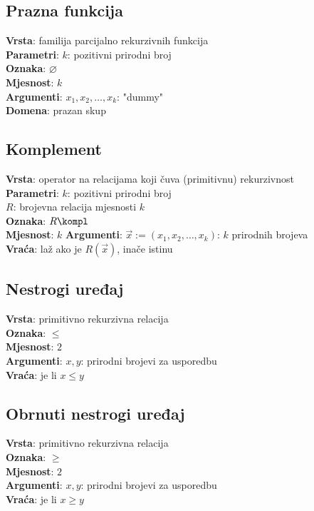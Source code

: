 \subsection{Prazna funkcija}
\textbf{Vrsta}: familija parcijalno rekurzivnih funkcija\\
\textbf{Parametri}: $k$: pozitivni prirodni broj\\
\textbf{Oznaka}: $\varnothing$\\
\textbf{Mjesnost}: $k$\\
\textbf{Argumenti}: $x_1,x_2,\dots,x_k$: "dummy"\\
\textbf{Domena}: prazan skup

\subsection{Komplement}
\textbf{Vrsta}: operator na relacijama koji čuva (primitivnu) rekurzivnost\\
\textbf{Parametri}: $k$: pozitivni prirodni broj\\
$R$: brojevna relacija mjesnosti $k$\\
\textbf{Oznaka}: $R\kompl$\\
\textbf{Mjesnost}: $k$
\textbf{Argumenti}: $\vec x:=(x_1,x_2,\dots,x_k)$: $k$ prirodnih brojeva\\
\textbf{Vraća}: laž ako je $R(\vec x)$, inače istinu

\subsection{Nestrogi uređaj}
\textbf{Vrsta}: primitivno rekurzivna relacija\\
\textbf{Oznaka}: $\le$\\
\textbf{Mjesnost}: $2$\\
\textbf{Argumenti}: $x,y$: prirodni brojevi za usporedbu\\
\textbf{Vraća}: je li $x\le y$

\subsection{Obrnuti nestrogi uređaj}
\textbf{Vrsta}: primitivno rekurzivna relacija\\
\textbf{Oznaka}: $\ge$\\
\textbf{Mjesnost}: $2$\\
\textbf{Argumenti}: $x,y$: prirodni brojevi za usporedbu\\
\textbf{Vraća}: je li $x\ge y$


